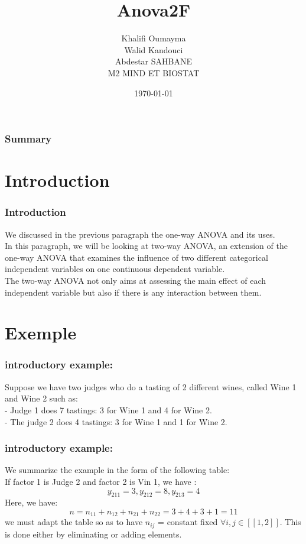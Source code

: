\documentclass{beamer}
\title{ Anova2F}
\author{\color{rouge} Khalifi Oumayma\\Walid Kandouci\\ Abdestar SAHBANE\\\color{fandango} M2 MIND ET BIOSTAT}
\institute{Faculté des sciences Montpellier}
\date{\today}
\begin{document}
\begin{frame}
\titlepage
\end{frame}

\begin{frame}
\frametitle{Summary}
\tableofcontents
\end{frame}
\section{Introduction}
\begin{frame}
\frametitle{Introduction}
We discussed in the previous paragraph the one-way ANOVA and its uses.
\\
In this paragraph, we will be looking at two-way ANOVA, an extension of the one-way ANOVA that examines the influence of two different categorical independent variables on one continuous dependent variable. \\
The two-way ANOVA not only aims at assessing the main effect of each independent variable but also if there is any interaction between them.
\end{frame}

\section{Exemple}


\begin{frame}
\frametitle{introductory example:}
Suppose we have two judges who do a tasting of 2 different wines, called Wine 1 and Wine 2 such as:\\
- Judge 1 does 7 tastings: 3 for Wine 1 and 4 for Wine 2.\\
- The judge 2 does 4 tastings: 3 for Wine 1 and 1 for Wine 2.
\end{frame}

\begin{frame}
\frametitle{introductory example:}
We summarize the example in the form of the following table:\\




If factor 1 is Judge 2 and factor 2 is Vin 1, we have :$$y_{211}=3, y_{212}=8, y_{213}=4 $$
Here, we have: \\$$n= n_{1 1}+n_{1 2}+n_{2 1}+n_{2 2}=3+4+3+1=11$$
we must adapt the table so as to have $n_{ij}$ = constant fixed $\forall i,j\in[\![1, 2]\!]$.
 This is done either by eliminating or adding elements.

\end{frame}
\end{document}

